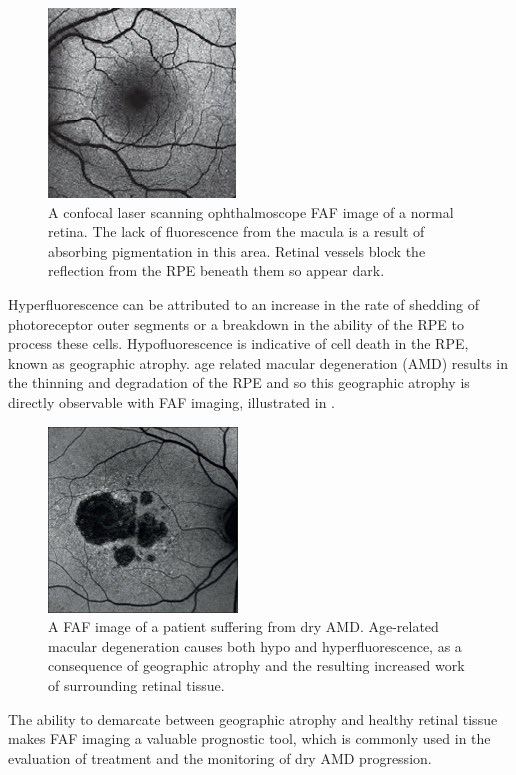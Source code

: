 \begin{figure}[H]
\centering
\includegraphics{figures/faf}
\caption{A confocal laser scanning ophthalmoscope FAF image of a normal retina. The lack of fluorescence from the macula is a result of absorbing pigmentation in this area. Retinal vessels block the reflection from the RPE beneath them so appear dark.}
\label{fig:faf}
   \end{figure}

Hyperfluorescence can be attributed to an increase in the rate
of shedding of photoreceptor outer segments or a breakdown in
the ability of the RPE to process these cells. Hypofluorescence
is indicative of cell death in the RPE, known as geographic atrophy.
age related macular degeneration (AMD) results in the thinning and
degradation of the RPE and so this geographic atrophy is directly
observable with FAF imaging, illustrated in .

\begin{figure}[H]
\centering
\includegraphics{figures/fafamd}
\caption{A FAF image of a patient suffering from dry AMD. Age-related macular degeneration causes both hypo and hyperfluorescence, as a consequence of geographic atrophy and the resulting increased work of surrounding retinal tissue.\cite{2_audo_2015}}
\label{fig:fafamd}
   \end{figure}

The ability to demarcate between geographic atrophy and healthy retinal tissue makes FAF imaging a valuable prognostic tool, which is commonly used in the evaluation of treatment and the monitoring of dry AMD progression.\cite{1_murphy_2015}

